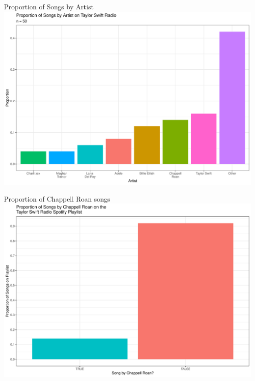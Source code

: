 \documentclass[
  ignorenonframetext,
]{beamer}
\begin{document}
\begin{frame}{Proportion of Songs by Artist}
\label{proportion-of-songs-by-artist}
\includegraphics{class09_files/figure-beamer/unnamed-chunk-4-1.pdf}
\end{frame}

\begin{frame}{Proportion of Chappell Roan songs}
\label{proportion-of-chappell-roan-songs}
\includegraphics{class09_files/figure-beamer/unnamed-chunk-5-1.pdf}
\end{frame}
\end{document}
